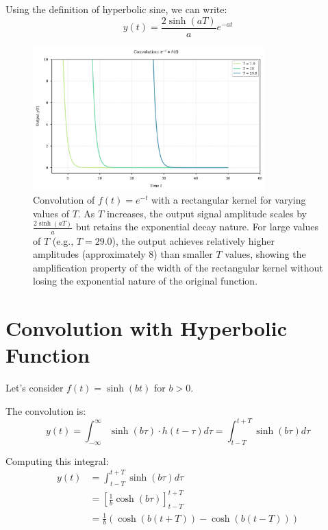 \documentclass{article}
\begin{document}
	Using the definition of hyperbolic sine, we can write:
	\begin{equation}
		y(t) = \frac{2\sinh(aT)}{a}e^{-at}
	\end{equation}
	
	\begin{figure}[htbp]
		\centering
		\includegraphics[width=0.8\textwidth]{figs/exp_convolution.png}
		\caption{Convolution of $f(t) = e^{-t}$ with a rectangular kernel for varying values of $T$. As $T$ increases, the output signal amplitude scales by $\frac{2\sinh(aT)}{a}$ but retains the exponential decay nature. For large values of $T$ (e.g., $T = 29.0$), the output achieves relatively higher amplitudes (approximately 8) than smaller $T$ values, showing the amplification property of the width of the rectangular kernel without losing the exponential nature of the original function.}
		\label{fig:exp_convolution}
	\end{figure}
	
	\section{Convolution with Hyperbolic Function}
	Let's consider $f(t) = \sinh(bt)$ for $b > 0$.
	
	The convolution is:
	\begin{equation}
		y(t) = \int_{-\infty}^{\infty} \sinh(b\tau) \cdot h(t - \tau) d\tau = \int_{t-T}^{t+T} \sinh(b\tau) d\tau
	\end{equation}
	
	Computing this integral:
	\begin{align}
		y(t) &= \int_{t-T}^{t+T} \sinh(b\tau) d\tau \\
		&= \left[ \frac{1}{b}\cosh(b\tau) \right]_{t-T}^{t+T} \\
		&= \frac{1}{b}(\cosh(b(t+T)) - \cosh(b(t-T)))
	\end{align}
	
\end{document}
